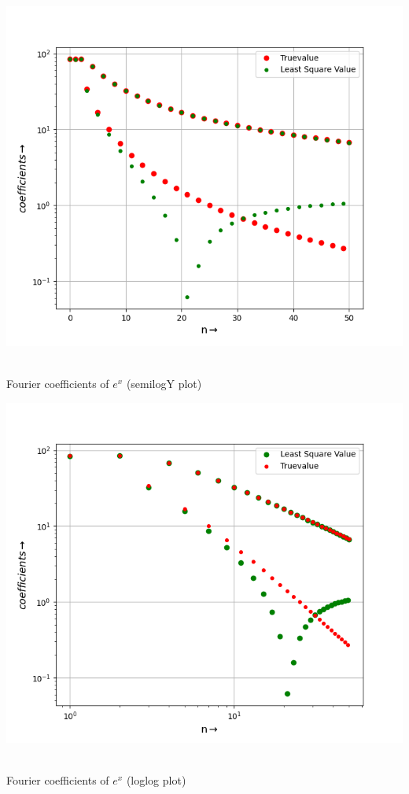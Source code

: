 \documentclass[12pt, a4paper]{report}
\begin{document}
\begin{center}
	\includegraphics[scale=0.85]{Figure_7} 
	\caption{\\Fourier coefficients of $e^x$ (semilogY plot)}
	\label{fig:rawdata}
\end{center}
\begin{center}
	\includegraphics[scale=0.85]{Figure_8} 
	\caption{\\Fourier coefficients of $e^x$ (loglog plot)}
	\label{fig:rawdata}
\end{center}
\end{document}
